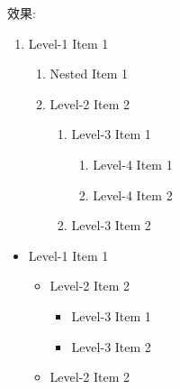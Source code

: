 \begin{itemize}
{    效果:
    \begin{enumerate}
      \item
      {
        Level-1 Item 1
        \begin{enumerate}
          \item Nested Item 1

          \item
          {
            Level-2 Item 2

            \begin{enumerate}
              \item
              {
                Level-3 Item 1

                \begin{enumerate}
                  \item Level-4 Item 1
                  \item Level-4 Item 2
                \end{enumerate}
              }

              \item Level-3 Item 2
            \end{enumerate}
          }
        \end{enumerate}
      }
    \end{enumerate}

    \begin{itemize}
      \item
      {
        Level-1 Item 1

        \begin{itemize}
        \item
        {
          Level-2 Item 2

          \begin{itemize}
          \item Level-3 Item 1
          \item Level-3 Item 2
          \end{itemize}
        }

        \item Level-2 Item 2
        \end{itemize}
      }
    \end{itemize}
  } %
\end{itemize}
